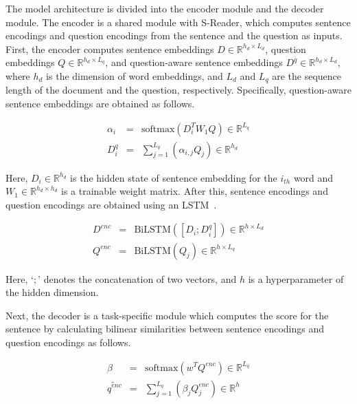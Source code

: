 \documentclass[11pt,a4paper]{article}
\begin{document}
The model architecture is divided into the encoder module and the decoder module. The encoder is a shared module with S-Reader, which computes sentence encodings and question encodings from the sentence and the question as inputs.
First, the encoder computes sentence embeddings $D \in \mathbb{R}^{h_d \times L_d}$, question embeddings $Q \in \mathbb{R}^{h_d \times L_q}$, and question-aware sentence embeddings $D^q \in \mathbb{R}^{h_d \times L_d}$, where $h_d$ is the dimension of word embeddings, and $L_d$ and $L_q$ are the sequence length of the document and the question, respectively. Specifically, question-aware sentence embeddings are obtained as follows.

\vspace{-.5cm}
\begin{eqnarray}\label{eq:encoder-1}
\alpha_{i} &=& \mathrm{softmax}({D_i^T}{W_1}{Q}) \in \mathbb{R}^{L_q}\\
    D^q_i &=& \sum_{j=1}^{L_q} (\alpha_{i,j}Q_j) \in \mathbb{R}^{h_d}
\end{eqnarray}

Here, $D_i\in \mathbb{R}^{h_d}$ is the hidden state of sentence embedding for the $i_{th}$ word and ${W_1} \in \mathbb{R}^{h_d \times h_d}$ is a trainable weight matrix.
After this, sentence encodings and question encodings are obtained using an LSTM~\cite{lstm}.

\vspace{-.5cm}
\begin{eqnarray}\label{eq:encoder-2}
D^{enc} &=& \mathrm{BiLSTM}([D_i;D^q_i]) \in \mathbb{R}^{h \times L_d} \\
    Q^{enc} &=& \mathrm{BiLSTM}(Q_j) \in \mathbb{R}^{h \times L_q}
\end{eqnarray}

Here, `$;$' denotes the concatenation of two vectors, and $h$ is a hyperparameter of the hidden dimension.


Next, the decoder is a task-specific module which computes the score for the sentence by calculating bilinear similarities between sentence encodings and question encodings as follows.

\vspace{-.5cm}
\begin{eqnarray}
	\beta &=& \mathrm{softmax} (w^T Q^{enc}) \in \mathbb{R}^{L_q} \\
	 {\tilde {q^{enc}}} &=& \sum_{j=1}^{L_q} (\beta_{j}Q^{enc}_j) \in \mathbb{R}^{h}
\end{eqnarray}
\end{document}
